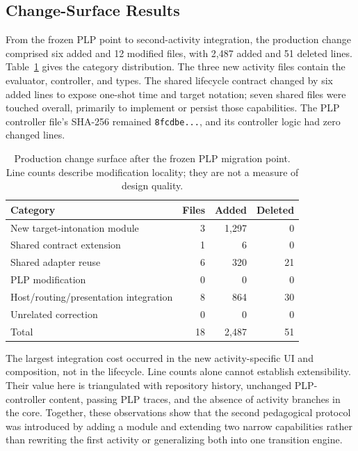 \documentclass[runningheads]{llncs}
\begin{document}
\subsection{Change-Surface Results}

From the frozen PLP point to second-activity integration, the production
change comprised six added and 12 modified files, with 2,487 added and 51
deleted lines. Table~\ref{tab:change} gives the category distribution. The
three new activity files contain the evaluator, controller, and types. The
shared lifecycle contract changed by six added lines to expose one-shot time
and target notation; seven shared files were touched overall, primarily to
implement or persist those capabilities. The PLP controller file's SHA-256
remained \texttt{8fcdbe...}, and its controller logic had zero changed lines.

\begin{table}[t]
\caption{Production change surface after the frozen PLP migration point. Line
counts describe modification locality; they are not a measure of design
quality.}
\label{tab:change}
\centering
\small
\begin{tabularx}{\textwidth}{@{}X r r r@{}}
\toprule
Category & Files & Added & Deleted\\
\midrule
New target-intonation module & 3 & 1,297 & 0\\
Shared contract extension & 1 & 6 & 0\\
Shared adapter reuse & 6 & 320 & 21\\
PLP modification & 0 & 0 & 0\\
Host/routing/presentation integration & 8 & 864 & 30\\
Unrelated correction & 0 & 0 & 0\\
\midrule
Total & 18 & 2,487 & 51\\
\bottomrule
\end{tabularx}
\end{table}

The largest integration cost occurred in the new activity-specific UI and
composition, not in the lifecycle. Line counts alone cannot establish
extensibility. Their value here is triangulated with repository history,
unchanged PLP-controller content, passing PLP traces, and the absence of
activity branches in the core. Together, these observations show that the
second pedagogical protocol was introduced by adding a module and extending
two narrow capabilities rather than rewriting the first activity or
generalizing both into one transition engine.
\end{document}
